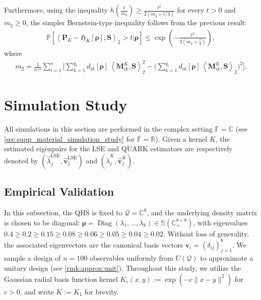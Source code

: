 \documentclass[noinfoline]{imsart}\setcounter{tocdepth}{2}
\renewcommand{\b}[1]{\mathbb{#1}} %
\newcommand{\m}[1]{\mathbf{#1}} %
\newcommand{\f}[1]{\mathfrak{#1}} %
\renewcommand{\c}[1]{\mathcal{#1}} %
\newcommand{\mb}[1]{\boldsymbol{#1}} %
\newcommand{\innpr}[2]{{\left\langle {#1},{#2}\right\rangle}} %
\newcommand{\Diag}{\operatorname{Diag}}
\theoremstyle{plain}
\begin{document}
Furthermore, using the inequality $h(\tfrac{t}{m_2})\geq \tfrac{t^2}{2(m_2+t/3)}$ for every $t>0$ and $m_2\geq 0$, the simpler Bernstein-type inequality follows from the previous result:
\begin{align*}
    \b{P} [ \innpr{\m{P}_{K} - \f{H}_{K} [\mb{\rho}]}{\m{S}}_{2}>t \vert \mb{\rho}] \leq \exp\left(-\frac{t^{2}}{2(m_{2} + \frac{t}{3})}\right),
\end{align*}
where
\begin{align*}
    m_{2} = \frac{1}{n^{2} r} \sum_{i=1}^{n} \Big[ \sum_{k=1}^{q_i} d_{ik}[\mb{\rho}]\,
\innpr{ \m{M}_{ik}^{K} }{\m{S}}_{2}^{2} - \big( \sum_{k=1}^{q_i} d_{ik}[\mb{\rho}]\,
\innpr{ \m{M}_{ik}^{K} }{\m{S}}_{2} \big)^{2} \Big].
\end{align*}




\section{Simulation Study}\label{sec:simstudy}
All simulations in this section are performed in the complex setting $\b{F}=\b{C}$ (see \cref{sec:supp_material_simulation_study} for $\b{F}=\b{R}$). 
Given a kernel $K$, the estimated eigenpairs for the LSE and QUARK estimators are respectively denoted by $(\hat \lambda_{j}^{\text{LSE}},\hat{\m{v}}_{j}^{\text{LSE}})$ and $(\hat \lambda_j^{K},\hat{\m v}_j^{K})$.


\subsection{Empirical Validation}\label{ssec:emp:val}
In this subsection, the QHS is fixed to $\c{Q}=\b{C}^{8}$, and the underlying density matrix is chosen to be diagonal:
$\mb{\rho} = \Diag (\lambda_{1}, \dots, \lambda_{8}) \in \b{S}(\b{C}_{+}^{8 \times 8})$, with eigenvalues 
$0.4 \geq 0.2 \geq 0.15 \geq 0.08 \geq 0.06 \geq 0.05 \geq 0.04 \geq 0.02$. Without loss of generality, the associated eigenvectors are the canonical basis vectors $\m{v}_{i}=(\delta_{ij})_{j=1}^{8}$. We sample a design of $n=100$ observables uniformly from $U(\c{Q})$ to approximate a unitary design (see \cref{rmk:approx:unit}). Throughout this study, we utilize the Gaussian radial basis function kernel $K_{c}(x,y) := \exp (-c \|x-y\|^{2})$ for $c>0$, and write $K:=K_{1}$ for brevity.
\end{document}
